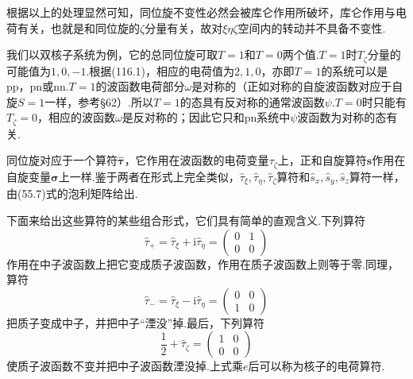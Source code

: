 根据以上的处理显然可知，同位旋不变性必然会被库仑作用所破坏，库仑作用与电荷有关，也就是和同位旋的$\zeta$分量有关，故对$\xi\eta\zeta$空间内的转动并不具备不变性.

我们以双核子系统为例，它的总同位旋可取$T=1$和$T=0$两个值.$T=1$时$T_\zeta$分量的可能值为$1,0,-1$.根据(116.1)，相应的电荷值为$2,1,0$，亦即$T=1$的系统可以是pp，pn或nn.$T=1$的波函数电荷部分$\omega$是对称的（正如对称的自旋波函数对应于自旋$S=1$一样，参考§62）.所以$T=1$的态具有反对称的通常波函数$\psi$.$T=0$时只能有$T_\zeta=0$，相应的波函数$\omega$是反对称的；因此它只和pn系统中$\psi$波函数为对称的态有关.

同位旋对应于一个算符$\hat{\boldsymbol{\tau}}$，它作用在波函数的电荷变量$\tau_\zeta$上，正和自旋算符$\hat{\boldsymbol{s}}$作用在自旋变量$\boldsymbol{\sigma}$上一样.鉴于两者在形式上完全类似，$\hat{\tau}_\xi,\hat{\tau}_\eta,\hat{\tau}_\zeta$算符和$\hat{s}_x,\hat{s}_y,\hat{s}_z$算符一样，由(55.7)式的泡利矩阵给出.

下面来给出这些算符的某些组合形式，它们具有简单的直观含义.下列算符
\begin{equation*}
  \hat{\tau}_+=\hat{\tau}_\xi+\mathrm{i}\hat{\tau}_\eta
  =\begin{pmatrix}0&1\\0&0\end{pmatrix}
\end{equation*}
作用在中子波函数上把它变成质子波函数，作用在质子波函数上则等于零.同理，算符
\begin{equation*}
  \hat{\tau}_-=\hat{\tau}_\xi-\mathrm{i}\hat{\tau}_\eta
  =\begin{pmatrix}0&0\\1&0\end{pmatrix}
\end{equation*}
把质子变成中子，并把中子“湮没”掉.最后，下列算符
\begin{equation*}
  \frac{1}{2}+\hat{\tau}_\zeta=\begin{pmatrix}1&0\\0&0\end{pmatrix}
\end{equation*}
使质子波函数不变并把中子波函数湮没掉.上式乘$e$后可以称为核子的电荷算符.

